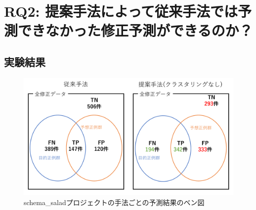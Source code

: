 \documentclass[11pt,dvipdfmx]{jreport}
\begin{document}
\section{RQ2: 提案手法によって従来手法では予測できなかった修正予測ができるのか？}\label{RQ2}

\subsection{実験結果}


\begin{figure}[bp]
	\centering
	\includegraphics[width=1\linewidth]{Kameoka_fig/benzu-schema-salad.pdf}
	\caption{schema\_saladプロジェクトの手法ごとの予測結果のベン図}
	\label{fig:schema_salad}
\end{figure}
\end{document}
